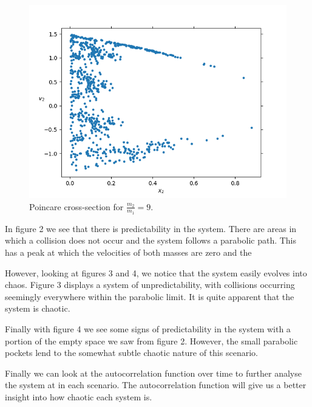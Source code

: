 \documentclass[pra,twocolumn,showpacs,amsmath,amssymb]{revtex4-2}
\begin{document}
\begin{figure}[t!]
\includegraphics[scale=0.50]{Poincare9.png}
\caption{Poincare cross-section for \(\frac{m_2}{m_1} = 9\).}\label{Poincare9}
\end{figure}

In figure 2 we see that there is predictability in the system. There are areas in which a collision does not occur and the system follows a parabolic path. This has a peak at which the velocities of both masses are zero and the  
\par However, looking at figures 3 and 4, we notice that the system easily evolves into chaos. Figure 3 displays a system of unpredictability, with collisions occurring seemingly everywhere within the parabolic limit. It is quite apparent that the system is chaotic.
\par Finally with figure 4 we see some signs of predictability in the system with a portion of the empty space we saw from figure 2. However, the small parabolic pockets lend to the somewhat subtle chaotic nature of this scenario.
\par Finally we can look at the autocorrelation function over time to further analyse the system at in each scenario. The autocorrelation function will give us a better insight into how chaotic each system is.
\end{document}
